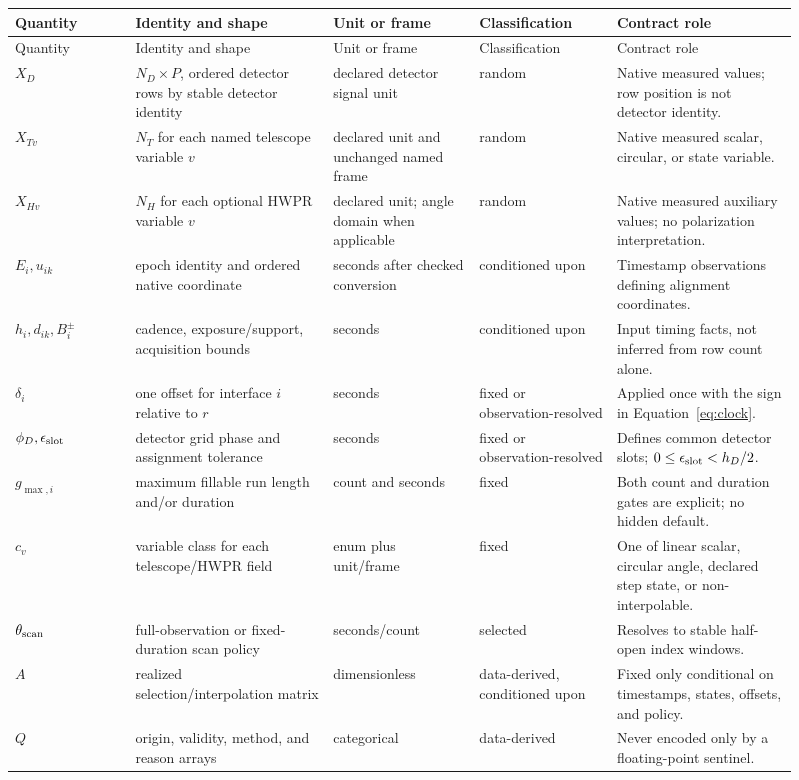 \documentclass[11pt]{article}
\begin{document}
\begin{longtable}{L{0.14\linewidth}L{0.23\linewidth}L{0.17\linewidth}L{0.16\linewidth}L{0.21\linewidth}}
\toprule
Quantity & Identity and shape & Unit or frame & Classification & Contract role\\
\midrule
\endfirsthead
\toprule
Quantity & Identity and shape & Unit or frame & Classification & Contract role\\
\midrule
\endhead
\(X_D\) & \(N_D\times P\), ordered detector rows by stable detector identity & declared detector signal unit & random & Native measured values; row position is not detector identity.\\
\(X_{Tv}\) & \(N_T\) for each named telescope variable \(v\) & declared unit and unchanged named frame & random & Native measured scalar, circular, or state variable.\\
\(X_{Hv}\) & \(N_H\) for each optional HWPR variable \(v\) & declared unit; angle domain when applicable & random & Native measured auxiliary values; no polarization interpretation.\\
\(E_i,u_{ik}\) & epoch identity and ordered native coordinate & seconds after checked conversion & conditioned upon & Timestamp observations defining alignment coordinates.\\
\(h_i,d_{ik},B_i^\pm\) & cadence, exposure/support, acquisition bounds & seconds & conditioned upon & Input timing facts, not inferred from row count alone.\\
\(\delta_i\) & one offset for interface \(i\) relative to \(r\) & seconds & fixed or observation-resolved & Applied once with the sign in Equation~\eqref{eq:clock}.\\
\(\phi_D,\epsilon_{\rm slot}\) & detector grid phase and assignment tolerance & seconds & fixed or observation-resolved & Defines common detector slots; \(0\leq\epsilon_{\rm slot}<h_D/2\).\\
\(g_{\max,i}\) & maximum fillable run length and/or duration & count and seconds & fixed & Both count and duration gates are explicit; no hidden default.\\
\(c_v\) & variable class for each telescope/HWPR field & enum plus unit/frame & fixed & One of linear scalar, circular angle, declared step state, or non-interpolable.\\
\(\theta_{\rm scan}\) & full-observation or fixed-duration scan policy & seconds/count & selected & Resolves to stable half-open index windows.\\
\(A\) & realized selection/interpolation matrix & dimensionless & data-derived, conditioned upon & Fixed only conditional on timestamps, states, offsets, and policy.\\
\(Q\) & origin, validity, method, and reason arrays & categorical & data-derived & Never encoded only by a floating-point sentinel.\\
\bottomrule
\end{longtable}
\end{document}
